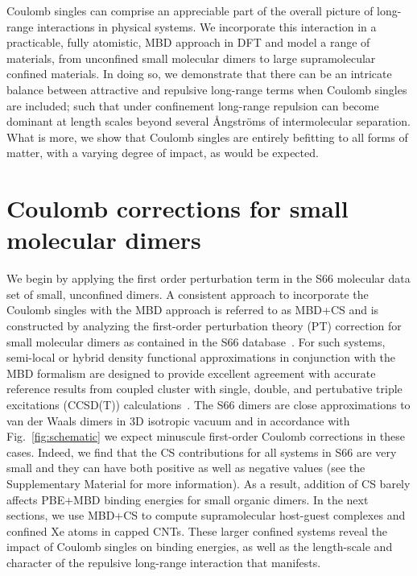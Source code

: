 \documentclass[aps,prl,groupaddress, twocolumn]{revtex4-1}  %
\begin{document}
Coulomb singles can comprise an appreciable part of the overall picture of long-range interactions in physical systems. We incorporate this interaction in a practicable, fully atomistic, MBD approach in DFT and model a range of materials, from unconfined small molecular dimers to large supramolecular confined materials. In doing so, we demonstrate that there can be an intricate balance between attractive and repulsive long-range terms when Coulomb singles are included; such that under confinement long-range repulsion can become dominant at length scales beyond several \r{A}ngstr\"{o}ms of intermolecular separation. What is more, we show that Coulomb singles are entirely befitting to all forms of matter, with a varying degree of impact, as would be expected. 

\section*{Coulomb corrections for small molecular dimers}
We begin by applying the first order perturbation term in the S66 molecular data set of small, unconfined dimers. A consistent approach to incorporate the Coulomb singles with the MBD approach is referred to as MBD+CS and is constructed by analyzing the first-order perturbation theory (PT) correction for small molecular dimers as contained in the S66 database~\cite{s66X8_database}.
For such systems, semi-local or hybrid density functional approximations in conjunction with the MBD formalism are designed to provide excellent agreement with accurate reference results from coupled cluster with single, double, and pertubative triple excitations (CCSD(T)) calculations~\cite{Tkatchenko2012}.  %
The S66 dimers are close approximations to van der Waals dimers in 3D isotropic vacuum and in accordance with Fig.~\ref{fig:schematic} we expect minuscule first-order Coulomb corrections in these cases.
Indeed, we find that the CS contributions for all systems in S66 are very small and they can have both positive as well as negative values (see the Supplementary Material for more information). As a result, addition of CS barely affects PBE+MBD binding energies for small organic dimers.
In the next sections, we use MBD+CS to compute supramolecular host-guest complexes and confined Xe atoms in capped CNTs. These larger confined systems reveal the impact of Coulomb singles on binding energies, as well as the length-scale and character of the repulsive long-range interaction that manifests. 
\end{document}
